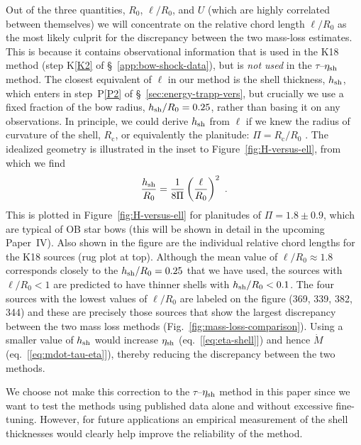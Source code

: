 
Out of the three quantities, \(R_0\), \(\ell/R_0\), and \(U\) (which
are highly correlated between themselves) we will concentrate on the
relative chord length \(\ell/R_0\) as the most likely culprit for the
discrepancy between the two mass-loss estimates.  This is because it
contains observational information that is used in the K18 method
(step K\ref{K2} of \S~\ref{app:bow-shock-data}), but is \textit{not
  used} in the \(\tau\)--\(\eta_{\text{sh}}\) method.  The closest
equivalent of \(\ell\) in our method is the shell thickness,
\(h_{\text{sh}}\), which enters in step~P\ref{P2} of
\S~\ref{sec:energy-trapp-vers}, but crucially we use a fixed fraction
of the bow radius, \(h_{\text{sh}} / R_0 = 0.25\), rather than basing it on
any observations.  In principle, we could derive \(h_{\text{sh}}\) from
\(\ell\) if we knew the radius of curvature of the shell,
\(R_{\text{c}}\), or equivalently the planitude:
\(\Pi = R_{\text{c}} / R_0\) \citep{Tarango-Yong:2018a}.  The idealized
geometry is illustrated in the inset to Figure~\ref{fig:H-versus-ell},
from which we find
\begin{equation}
  \label{eq:h-R0}
  \frac{h\shell}{R_0} = \frac{1}{8\Pi} \left(\frac{\ell}{R_0}\right)^2 \ .
\end{equation}
This is plotted in Figure~\ref{fig:H-versus-ell} for planitudes of
\(\Pi = 1.8 \pm 0.9\), which are typical of OB star bows (this will be
shown in detail in the upcoming Paper~IV).  Also shown in the figure
are the individual relative chord lengths for the K18 sources (rug
plot at top).  Although the mean value of \(\ell/R_0 \approx 1.8\)
corresponds closely to the \(h_{\text{sh}}/R_0 = 0.25\) that we have used,
the sources with \(\ell/R_0 < 1\) are predicted to have thinner shells
with \(h_{\text{sh}}/R_0 < 0.1\).  The four sources with the lowest values
of \(\ell/R_0\) are labeled on the figure (369, 339, 382, 344) and
these are precisely those sources that show the largest discrepancy
between the two mass loss methods
(Fig.~\ref{fig:mass-loss-comparison}).  Using a smaller value of
\(h_{\text{sh}}\) would increase \(\eta_{\text{sh}}\) (eq.~[\ref{eq:eta-shell}])
and hence \(\dot{M}\) (eq.~[\ref{eq:mdot-tau-eta}]), thereby reducing
the discrepancy between the two methods.

We choose not make this correction to the \(\tau\)--\(\eta_{\text{sh}}\)
method in this paper since we want to test the methods using published
data alone and without excessive fine-tuning.  However, for future
applications an empirical measurement of the shell thicknesses would
clearly help improve the reliability of the method.


